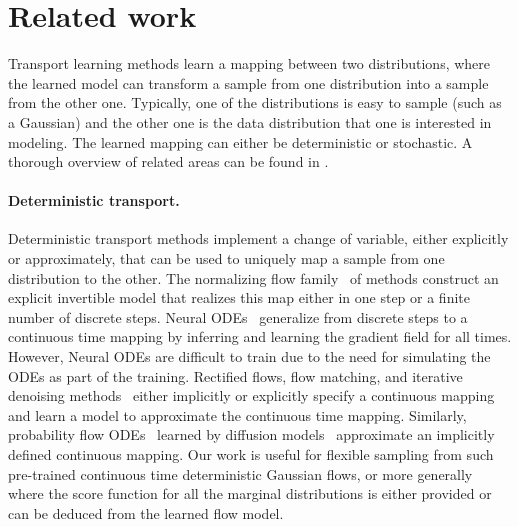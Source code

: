\section{Related work}

Transport learning methods learn a mapping between two distributions, where the learned model can transform a sample from one distribution into a sample from the other one.
Typically, one of the distributions is easy to sample (such as a Gaussian) and the other one is the data distribution that one is interested in modeling.
The learned mapping can either be deterministic or stochastic.
A thorough overview of related areas can be found in \citet{yang2024diffusion}.

\paragraph{Deterministic transport.}
Deterministic transport methods implement a change of variable, either explicitly or approximately, that can be used to uniquely map a sample from one distribution to the other.
The normalizing flow family~\citep{rezende2015variational,dinh2017density,kingma2018glow} of methods construct an explicit invertible model that realizes this map either in one step or a finite number of discrete steps.
Neural ODEs~\citep{chen2018neural,grathwohl2018scalable} generalize from discrete steps to a continuous time mapping by inferring and learning the gradient field for all times.
However, Neural ODEs are difficult to train due to the need for simulating the ODEs as part of the training.
Rectified flows, flow matching, and iterative denoising methods~\citep{liu2022flow,lipman2022flow,tong2023improving,heitz2023iterative,delbracio2023inversion} either implicitly or explicitly specify a continuous mapping and learn a model to approximate the continuous time mapping.
Similarly, probability flow ODEs~\citep{song2020score} learned by diffusion models~\citep{sohl2015deep} approximate an implicitly defined continuous mapping.
Our work is useful for flexible sampling from such pre-trained continuous time deterministic Gaussian flows, or more generally where the score function for all the marginal distributions is either provided or can be deduced from the learned flow model.


